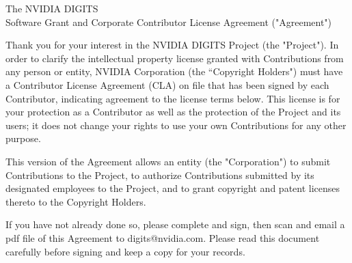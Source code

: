 \documentclass[a4paper,12pt,notitlepage]{article}
\begin{document}
\pagestyle{empty}
\begin{center}
{\Large The NVIDIA DIGITS\\Software Grant and Corporate Contributor License Agreement ("Agreement")}
\end{center}
Thank you for your interest in the NVIDIA DIGITS Project (the
"Project"). In order to clarify the intellectual property license
granted with Contributions from any person or entity, NVIDIA
Corporation (the “Copyright Holders") must have a Contributor License
Agreement (CLA) on file that has been signed by each Contributor,
indicating agreement to the license terms below. This license is
for your protection as a Contributor as well as the protection of the
Project and its users; it does not change your rights to use your own
Contributions for any other purpose.

This version of the Agreement allows an entity (the "Corporation") to
submit Contributions to the Project, to authorize Contributions
submitted by its designated employees to the Project, and to grant
copyright and patent licenses thereto to the Copyright Holders.

If you have not already done so, please complete and sign, then scan and
email a pdf file of this Agreement to digits@nvidia.com.
Please read this document carefully before signing and keep a copy for
your records.
\end{document}
